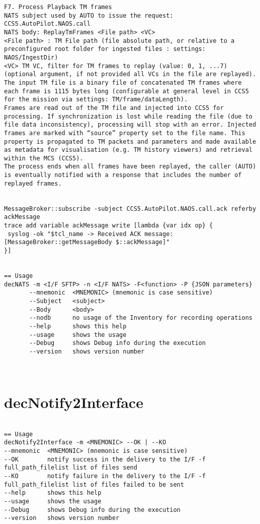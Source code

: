 \documentclass[dec_sum_main.tex]{subfiles}
\begin{document}
\begin{verbatim}
F7. Process Playback TM frames
NATS subject used by AUTO to issue the request: CCS5.AutoPilot.NAOS.call
NATS body: ReplayTmFrames <File path> <VC>
<File path> : TM File path (file absolute path, or relative to a preconfigured root folder for ingested files : settings: NAOS/IngestDir)
<VC> TM VC, filter for TM frames to replay (value: 0, 1, ...7) (optional argument, if not provided all VCs in the file are replayed).
The input TM file is a binary file of concatenated TM frames where each frame is 1115 bytes long (configurable at general level in CCS5 for the mission via settings: TM/frame/dataLength).
Frames are read out of the TM file and injected into CCS5 for processing. If synchronization is lost while reading the file (due to file data inconsistency), processing will stop with an error. Injected frames are marked with “source” property set to the file name. This property is propagated to TM packets and parameters and made available as metadata for visualisation (e.g. TM history viewers) and retrieval within the MCS (CCS5).
The process ends when all frames have been replayed, the caller (AUTO) is eventually notified with a response that includes the number of replayed frames.


MessageBroker::subscribe -subject CCS5.AutoPilot.NAOS.call.ack referby ackMessage
trace add variable ackMessage write [lambda {var idx op} {
 syslog -ok "$tcl_name -> Received ACK message: [MessageBroker::getMessageBody $::ackMessage]"
}]


== Usage
decNATS -m <I/F SFTP> -n <I/F NATS> -F<function> -P {JSON parameters}
       --mnemonic  <MNEMONIC> (mnemonic is case sensitive)
       --Subject   <subject>
       --Body      <body>
       --nodb      no usage of the Inventory for recording operations
       --help      shows this help
       --usage     shows the usage
       --Debug     shows Debug info during the execution
       --version   shows version number



\end{verbatim}

\label{decNotify2Interface}
\section{decNotify2Interface}

\begin{verbatim}

== Usage
decNotify2Interface -m <MNEMONIC> --OK | --KO
--mnemonic  <MNEMONIC> (mnemonic is case sensitive)
--OK        notify success in the delivery to the I/F -f full_path_filelist list of files send
--KO        notify failure in the delivery to the I/F -f full_path_filelist list of files failed to be sent
--help      shows this help
--usage     shows the usage
--Debug     shows Debug info during the execution
--version   shows version number

\end{verbatim}
\end{document}
